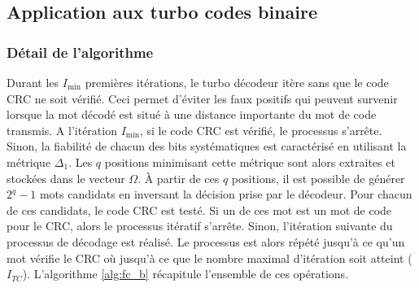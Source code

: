 \subsection{Application aux turbo codes binaire}

\subsubsection{Détail de l'algorithme}
Durant les $I_{\text{min}}$ premières itérations, le turbo décodeur itère sans que le code
CRC ne soit vérifié. Ceci permet d'éviter les faux positifs qui peuvent survenir lorsque la mot décodé est situé à une 
distance importante du mot de code transmis. A l'itération $I_{\text{min}}$, si le code CRC est vérifié, le processus
s'arrête. Sinon, la fiabilité de chacun des bits systématiques est caractérisé en utilisant la métrique $\Delta_1$.
Les $q$ positions minimisant cette métrique sont alors extraites et stockées dans le vecteur $\Omega$. À partir de ces $q$ positions,
il est possible de générer $2^q-1$ mots candidats en inversant la décision prise par le décodeur. Pour chacun de ces 
candidats, le code CRC est testé. Si un de ces mot est un mot de code pour le CRC, alors le processus itératif s'arrête. Sinon, 
l'itération suivante du processus de décodage est réalisé. Le processus est alors répété jusqu'à ce qu'un mot vérifie le 
CRC où jusqu'à ce que le nombre maximal d'itération soit atteint ($I_{TC}$). L'algorithme \ref{alg:fc_b} récapitule l'ensemble de 
ces opérations.

